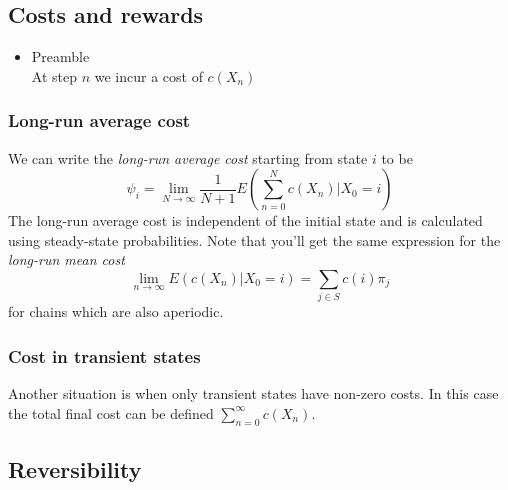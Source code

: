 \documentclass[11pt,a4paper]{article}
\begin{document}
\subsection{Costs and rewards}

\begin{itemize}

    \item Preamble \\
        At step $n$ we incur a cost of $c(X_n)$

\end{itemize}

\subsubsection{Long-run average cost}

We can write the \emph{long-run average cost} starting from state $i$ to be
\[
    \psi_i = \lim_{N \to \infty} \frac{1}{N+1} E\left( \sum_{n=0}^N c(X_n) | X_0 = i \right)
\]
The long-run average cost is independent of the initial state and is calculated using steady-state probabilities.
Note that you'll get the same expression for the \emph{long-run mean cost}
\[
    \lim_{n \to \infty} E(c(X_n)|X_0=i) = \sum_{j \in S}c(i)\pi_j
\]
for chains which are also aperiodic.

\subsubsection{Cost in transient states}
Another situation is when only transient states have non-zero costs.
In this case the total final cost can be defined $\sum_{n=0}^\infty c(X_n)$.

\subsection{Reversibility}
\end{document}
